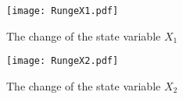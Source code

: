 \documentclass[a4paper,10pt,twocolumn,fleqn]{jarticle}
\begin{document}
  \begin{figure}[htbp]
    \begin{center}
      \texttt{[image: RungeX1.pdf]}
      \caption{The change of the state variable $X_1$}
      \label{RungeX1}
    \end{center}
  \end{figure}

  \begin{figure}[htbp]
    \begin{center}
      \texttt{[image: RungeX2.pdf]}
      \caption{The change of the state variable $X_2$}
      \label{RungeX2}
    \end{center}
  \end{figure}
\end{document}
